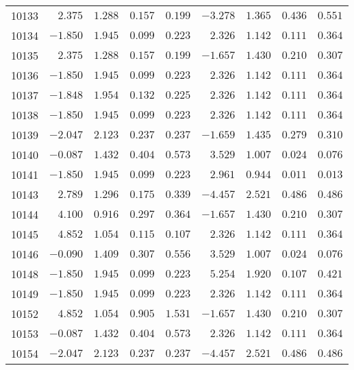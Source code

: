 \documentclass[6pt]{article}
\begin{document}
\begin{landscape}
{\begin{longtable}{lrrrrrrrr}
10133&$ 2.375$&$1.288$&$0.157$&$0.199$&$-3.278$&$1.365$&$0.436$&$0.551$\tabularnewline
10134&$-1.850$&$1.945$&$0.099$&$0.223$&$ 2.326$&$1.142$&$0.111$&$0.364$\tabularnewline
10135&$ 2.375$&$1.288$&$0.157$&$0.199$&$-1.657$&$1.430$&$0.210$&$0.307$\tabularnewline
10136&$-1.850$&$1.945$&$0.099$&$0.223$&$ 2.326$&$1.142$&$0.111$&$0.364$\tabularnewline
10137&$-1.848$&$1.954$&$0.132$&$0.225$&$ 2.326$&$1.142$&$0.111$&$0.364$\tabularnewline
10138&$-1.850$&$1.945$&$0.099$&$0.223$&$ 2.326$&$1.142$&$0.111$&$0.364$\tabularnewline
10139&$-2.047$&$2.123$&$0.237$&$0.237$&$-1.659$&$1.435$&$0.279$&$0.310$\tabularnewline
10140&$-0.087$&$1.432$&$0.404$&$0.573$&$ 3.529$&$1.007$&$0.024$&$0.076$\tabularnewline
10141&$-1.850$&$1.945$&$0.099$&$0.223$&$ 2.961$&$0.944$&$0.011$&$0.013$\tabularnewline
10143&$ 2.789$&$1.296$&$0.175$&$0.339$&$-4.457$&$2.521$&$0.486$&$0.486$\tabularnewline
10144&$ 4.100$&$0.916$&$0.297$&$0.364$&$-1.657$&$1.430$&$0.210$&$0.307$\tabularnewline
10145&$ 4.852$&$1.054$&$0.115$&$0.107$&$ 2.326$&$1.142$&$0.111$&$0.364$\tabularnewline
10146&$-0.090$&$1.409$&$0.307$&$0.556$&$ 3.529$&$1.007$&$0.024$&$0.076$\tabularnewline
10148&$-1.850$&$1.945$&$0.099$&$0.223$&$ 5.254$&$1.920$&$0.107$&$0.421$\tabularnewline
10149&$-1.850$&$1.945$&$0.099$&$0.223$&$ 2.326$&$1.142$&$0.111$&$0.364$\tabularnewline
10152&$ 4.852$&$1.054$&$0.905$&$1.531$&$-1.657$&$1.430$&$0.210$&$0.307$\tabularnewline
10153&$-0.087$&$1.432$&$0.404$&$0.573$&$ 2.326$&$1.142$&$0.111$&$0.364$\tabularnewline
10154&$-2.047$&$2.123$&$0.237$&$0.237$&$-4.457$&$2.521$&$0.486$&$0.486$\tabularnewline
\hline
\end{longtable}}\end{landscape}
\end{document}

